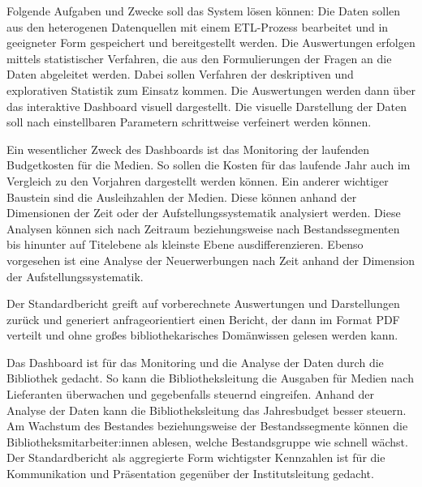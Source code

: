 Folgende Aufgaben und Zwecke soll das System lösen können:
Die Daten sollen aus den heterogenen Datenquellen mit einem \acrfull{ETL}-Prozess bearbeitet und in
geeigneter Form gespeichert und bereitgestellt werden. Die Auswertungen erfolgen mittels statistischer Verfahren, 
die aus den Formulierungen der Fragen an die Daten abgeleitet werden. Dabei sollen Verfahren der deskriptiven und explorativen Statistik zum Einsatz kommen.
Die Auswertungen werden dann über das interaktive Dashboard visuell dargestellt.
Die visuelle Darstellung der Daten soll nach einstellbaren Parametern schrittweise verfeinert werden können.

Ein wesentlicher Zweck des Dashboards ist das Monitoring der laufenden Budgetkosten für die Medien. So sollen die Kosten für das laufende Jahr auch im Vergleich zu den
Vorjahren dargestellt werden können. Ein anderer wichtiger Baustein sind die Ausleihzahlen der Medien. Diese können
anhand der Dimensionen der Zeit oder der Aufstellungssystematik analysiert werden. Diese Analysen können sich 
nach Zeitraum beziehungsweise nach Bestandssegmenten bis hinunter auf Titelebene als kleinste Ebene ausdifferenzieren. 
Ebenso vorgesehen ist eine Analyse der Neuerwerbungen nach Zeit anhand der Dimension der Aufstellungssystematik.

Der Standardbericht greift auf vorberechnete Auswertungen und Darstellungen zurück und generiert anfrageorientiert einen Bericht, der dann im
Format PDF verteilt und ohne großes bibliothekarisches Domänwissen gelesen werden kann.

Das Dashboard ist für das Monitoring und die Analyse der Daten durch die Bibliothek gedacht. 
So kann die Bibliotheksleitung die Ausgaben für Medien nach Lieferanten überwachen und gegebenfalls steuernd eingreifen.
Anhand der Analyse der Daten kann die Bibliotheksleitung das Jahresbudget besser steuern.
Am Wachstum des Bestandes beziehungsweise der Bestandssegmente können die Bibliotheksmitarbeiter:innen ablesen, welche Bestandsgruppe
wie schnell wächst.
Der Standardbericht als aggregierte Form wichtigster Kennzahlen ist für die Kommunikation und Präsentation gegenüber der Institutsleitung gedacht.





